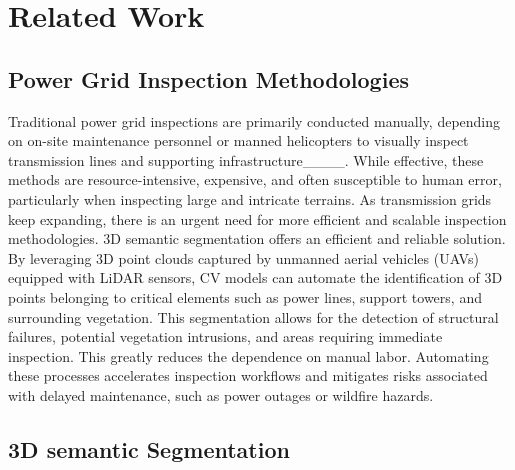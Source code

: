 \section{Related Work~\label{sec:related_work}
}

\subsection{Power Grid Inspection Methodologies}

Traditional power grid inspections are primarily conducted manually, depending on on-site maintenance personnel or manned helicopters to visually inspect transmission lines and supporting infrastructure____. 
While effective, these methods are resource-intensive, expensive, and often susceptible to human error, particularly when inspecting large and intricate terrains. As transmission grids keep expanding, there is an urgent need for more efficient and scalable inspection methodologies.
%
3D semantic segmentation offers an efficient and reliable solution. By leveraging 3D point clouds captured by unmanned aerial vehicles (UAVs) equipped with LiDAR sensors, CV models can automate the identification of 3D points belonging to critical elements such as power lines, support towers, and surrounding vegetation. 
%
This segmentation allows for the detection of structural failures, potential vegetation intrusions, and areas requiring immediate inspection. This greatly reduces the dependence on manual labor. 
Automating these processes accelerates inspection workflows and mitigates risks associated with delayed maintenance, such as power outages or wildfire hazards.



\subsection{3D semantic Segmentation}

